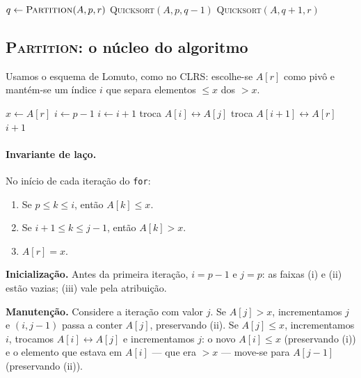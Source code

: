 \documentclass[9pt,a4paper]{extarticle}
\newcommand{\impt}[1]{\textcolor{important}{#1}}
\theoremstyle{definition}
\begin{document}
\begin{algorithm}[H]
\caption{\textsc{Quicksort}$(A, p, r)$}
\begin{algorithmic}[1]
  \State $q \gets \textsc{Partition}(A, p, r)$
  \State \textsc{Quicksort}$(A, p, q-1)$
  \State \textsc{Quicksort}$(A, q+1, r)$
\EndIf
\end{algorithmic}
\end{algorithm}

\subsection{\textsc{Partition}: o núcleo do algoritmo}

Usamos o esquema de \impt{Lomuto}, como no CLRS: escolhe-se $A[r]$ como
pivô e mantém-se um índice $i$ que separa elementos $\le x$ dos $> x$.

\begin{algorithm}[H]
\caption{\textsc{Partition}$(A, p, r)$}
\begin{algorithmic}[1]
\State $x \gets A[r]$
\State $i \gets p - 1$
    \State $i \gets i + 1$
    \State troca $A[i] \leftrightarrow A[j]$
  \EndIf
\EndFor
\State troca $A[i+1] \leftrightarrow A[r]$
\State \Return $i + 1$
\end{algorithmic}
\end{algorithm}

\paragraph{Invariante de laço.} No início de cada iteração do \texttt{for}:
\begin{enumerate}
  \item[(i)] Se $p \le k \le i$, então $A[k] \le x$.
  \item[(ii)] Se $i+1 \le k \le j-1$, então $A[k] > x$.
  \item[(iii)] $A[r] = x$.
\end{enumerate}

\textbf{Inicialização.} Antes da primeira iteração, $i = p-1$ e $j = p$:
as faixas (i) e (ii) estão vazias; (iii) vale pela atribuição.

\textbf{Manutenção.} Considere a iteração com valor $j$. Se $A[j] > x$,
incrementamos $j$ e $(i,j-1)$ passa a conter $A[j]$, preservando (ii).
Se $A[j] \le x$, incrementamos $i$, trocamos $A[i] \leftrightarrow A[j]$ e
incrementamos $j$: o novo $A[i] \le x$ (preservando (i)) e o elemento que
estava em $A[i]$ --- que era $> x$ --- move-se para $A[j-1]$ (preservando (ii)).
\end{document}
